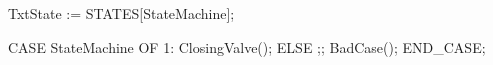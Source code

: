 TxtState := STATES[StateMachine];
 
CASE StateMachine OF
   1: ClosingValve();
ELSE
    ;; BadCase();
END_CASE;